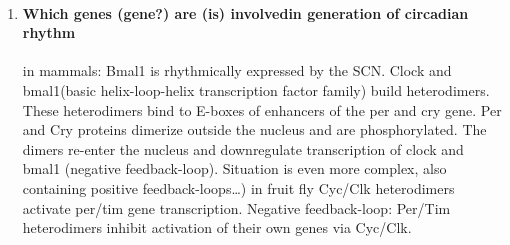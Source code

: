 \documentclass[12pt,article,oneside,a4paper]{memoir}
\begin{document}
\begin{enumerate}
\item \paragraph{Which genes (gene?) are (is) involvedin generation of circadian rhythm}

in mammals: Bmal1 is rhythmically expressed by the SCN. Clock and bmal1(basic helix-loop-helix transcription factor family) build heterodimers. These heterodimers bind to E-boxes of enhancers of the per and cry gene. Per and Cry proteins dimerize outside the nucleus and are phosphorylated. The dimers re-enter the nucleus and downregulate transcription of  clock and bmal1 (negative feedback-loop). Situation is even more complex, also containing positive feedback-loops…)
        in fruit fly Cyc/Clk heterodimers activate per/tim gene transcription. Negative feedback-loop: Per/Tim heterodimers inhibit activation of their own genes via Cyc/Clk.
\end{enumerate}

\end{document}
